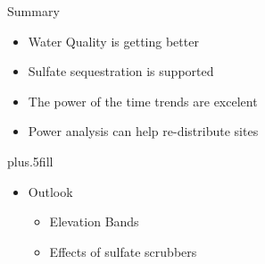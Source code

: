 \documentclass[svgnames,smaller]{beamer}
\begin{document}
\begin{frame}{Summary}

  \begin{itemize}
  \item
    \alert{Water Quality is getting better}\pause
  \item
    \alert{Sulfate sequestration is supported}\pause
  \item
    \alert{The power of the time trends are excelent}\pause
  \item
     \alert{Power analysis can help re-distribute sites}\pause
  \end{itemize}
  
  \vskip0pt plus.5fill
  \begin{itemize}
  \item
    Outlook
    \begin{itemize}
    \item
     Elevation Bands
    \item
      Effects of sulfate scrubbers
    \end{itemize}
  \end{itemize}
\end{frame}
\end{document}
